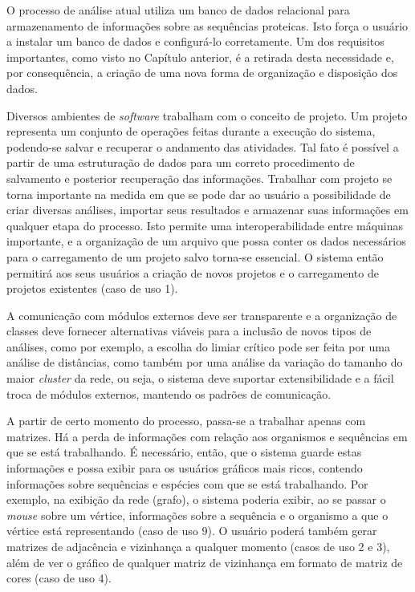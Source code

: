 O processo de análise atual utiliza um banco de dados relacional para armazenamento de informações
sobre as sequências proteicas. Isto força o usuário a instalar
um banco de dados e configurá-lo corretamente. Um dos requisitos importantes, como visto no Capítulo anterior, é a retirada desta necessidade e,
por consequência, a criação de uma nova forma de organização e disposição dos dados.

Diversos ambientes de \textit{software} trabalham com o conceito de projeto. Um projeto
representa um conjunto de operações feitas durante a execução do sistema,
podendo-se salvar e recuperar o andamento das atividades. Tal fato é possível a partir de uma estruturação de dados para um correto procedimento de
salvamento e posterior recuperação das informações. Trabalhar com projeto se torna importante na medida em que se pode
dar ao usuário a possibilidade de criar
diversas análises, importar seus resultados e armazenar suas informações em qualquer etapa do processo.
Isto permite uma interoperabilidade entre máquinas importante, e a organização de um arquivo
que possa conter os dados necessários para o carregamento de um projeto salvo torna-se essencial. O sistema então permitirá aos seus usuários a criação de
novos projetos e o carregamento de projetos existentes (caso de uso 1).

A comunicação com módulos externos deve ser transparente e a organização de classes deve fornecer alternativas viáveis para a inclusão de novos
tipos de análises, como por exemplo, a escolha do limiar crítico pode ser feita por uma análise de distâncias, como também por uma análise da variação
do tamanho
do maior \textit{cluster} da rede, ou seja, o sistema deve suportar extensibilidade e a fácil troca de módulos externos, mantendo
os padrões de comunicação.

A partir de certo momento do processo, passa-se a trabalhar apenas com matrizes. Há a perda de informações com relação aos organismos e sequências em que
se está trabalhando. É necessário, então, que o sistema guarde estas informações e possa exibir para os usuários gráficos mais ricos, contendo informações
sobre sequências e espécies com que se está trabalhando. Por exemplo, na exibição da rede (grafo), o sistema poderia exibir, ao se passar o \textit{mouse}
sobre um vértice,
informações sobre a sequência e o organismo a que o vértice está representando (caso de uso 9). O usuário poderá também gerar matrizes de adjacência e
vizinhança a qualquer momento (casos de uso 2 e 3), além de ver o gráfico de qualquer matriz de vizinhança em formato de matriz de cores (caso de uso 4).


